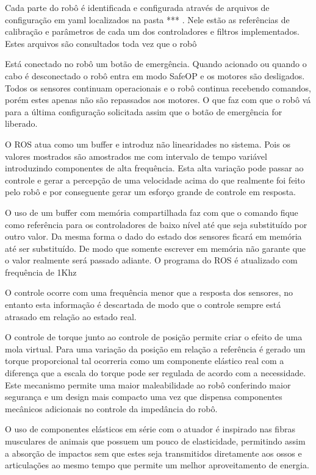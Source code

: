 Cada parte do robô é identificada e configurada através de arquivos de configuração em yaml localizados na pasta *** . Nele estão as referências de calibração e parâmetros de cada um dos controladores e filtros implementados. Estes arquivos são consultados toda vez que o robô 

Está conectado no robô um botão de emergência. Quando acionado ou quando o cabo é desconectado o robô entra em modo SafeOP e os motores são desligados. Todos os sensores continuam operacionais e o robô continua recebendo comandos, porém estes apenas não são repassados aos motores. O que faz com que o robô vá para a última configuração solicitada assim que o botão de emergência for liberado.

O ROS atua como um buffer e introduz não linearidades no sistema. Pois os valores mostrados são amostrados me com intervalo de tempo variável introduzindo componentes de alta frequência. Esta alta variação pode passar ao controle e gerar a percepção de uma velocidade acima do que realmente foi feito pelo robô e por conseguente gerar um esforço grande de controle em resposta.

O uso de um buffer com memória compartilhada faz com que o comando fique como referência para os controladores de baixo nível até que seja substituído por outro valor. Da mesma forma o dado do estado dos sensores ficará em memória até ser substituído. De modo que somente escrever em memória não garante que o valor realmente será passado adiante. O programa do ROS é atualizado com frequência de 1Khz

O controle ocorre com uma frequência menor que a resposta dos sensores, no entanto esta informação é descartada de modo que o controle sempre está atrasado em relação ao estado real.

O controle de torque junto ao controle de posição permite criar o efeito de uma mola virtual. Para uma variação da posição em relação a referência é gerado um torque proporcional tal ocorreria como um componente elástico real com a diferença que a escala do torque pode ser regulada de acordo com a necessidade. Este mecanismo permite uma maior maleabilidade ao robô conferindo maior segurança e um design mais compacto uma vez que dispensa componentes mecânicos adicionais no controle da impedância do robô.

O uso de componentes elásticos em série com o atuador é inspirado nas fibras musculares de animais que possuem um pouco de elasticidade, permitindo assim a absorção de impactos sem que estes seja transmitidos diretamente aos ossos e articulações ao mesmo tempo que permite um melhor aproveitamento de energia. 

